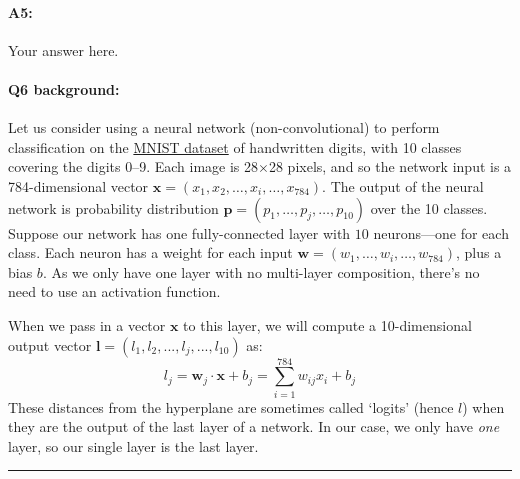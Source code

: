 \paragraph{A5:} Your answer here.









\pagebreak
\paragraph{Q6 background:} 
Let us consider using a neural network (non-convolutional) to perform classification on the \href{http://yann.lecun.com/exdb/mnist/}{MNIST dataset} of handwritten digits, with 10 classes covering the digits 0--9. Each image is 28$\times$28 pixels, and so the network input is a 784-dimensional vector $\mathbf{x}=(x_1,x_2,\dots,x_i,\dots,x_{784})$. The output of the neural network is probability distribution $\mathbf{p}=(p_1,\dots,p_j,\dots,p_{10})$ over the 10 classes. Suppose our network has one fully-connected layer with $10$ neurons---one for each class. Each neuron has a weight for each input $\mathbf{w}=(w_1,\dots,w_i,\dots,w_{784})$, plus a bias $b$. As we only have one layer with no multi-layer composition, there's no need to use an activation function.

When we pass in a vector $\mathbf{x}$ to this layer, we will compute a 10-dimensional output vector $\mathbf{l}=(l_1,l_2,...,l_j,...,l_{10})$ as: 
\begin{equation}
    l_j = \mathbf{w}_j \cdot \mathbf{x} + b_j = \sum_{i=1}^{784}w_{ij}x_i + b_j
\end{equation} 
These distances from the hyperplane are sometimes called `logits' (hence $l$) when they are the output of the last layer of a network. In our case, we only have \emph{one} layer, so our single layer is the last layer.

\hspace{\fill}\rule{0.5\linewidth}{.5pt}\hspace{\fill}

